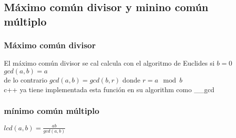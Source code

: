 \subsection{Máximo común divisor y minino común múltiplo}
\subsubsection{Máximo común divisor}
El máximo común divisor se cal calcula con el algoritmo de Euclides
si $b=0$  $gcd(a,b)=a$\\
de lo contrario $ gcd(a,b)=gcd(b,r)$ donde $r=a \mod{b}$\\
c++ ya tiene implementada esta función en su  algorithm como \_\_gcd

\subsubsection{mínimo común múltiplo}
$lcd(a,b)=\frac{ab}{gcd(a,b)}$
